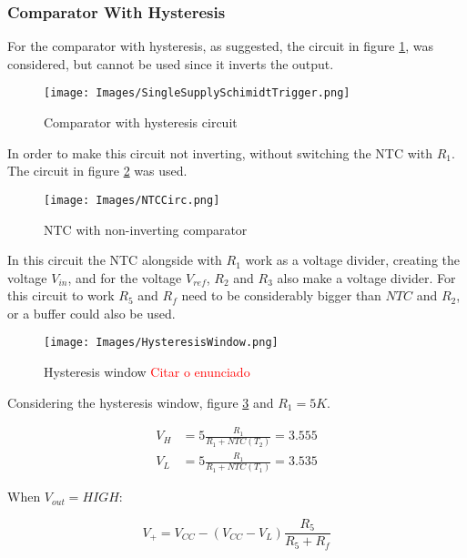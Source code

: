 \subsubsection{Comparator With Hysteresis}

For the comparator with hysteresis, as suggested, the circuit in figure \ref{fig:ComparatorCirc}, was considered, but cannot be used since it inverts the output.

\begin{figure}[H]
    \centering
    \texttt{[image: Images/SingleSupplySchimidtTrigger.png]}
    \caption{Comparator with hysteresis circuit \textsuperscript{\cite{NTC_datasheet}}}
    \label{fig:ComparatorCirc}
\end{figure}

In order to make this circuit not inverting, without switching the NTC with $R_{1}$. The circuit in figure \ref{fig:NTCCirc} was used.

\begin{figure}[H]
    \centering
    \texttt{[image: Images/NTCCirc.png]}
    \caption{NTC with non-inverting comparator}
    \label{fig:NTCCirc}
\end{figure}

In this circuit the NTC alongside with $R_1$ work as a voltage divider, creating the voltage $V_{in}$, and for the voltage $V_{ref}$, $R_2$ and $R_3$ also make a voltage divider. 
For this circuit to work $R_5$ and $R_f$ need to be considerably bigger than $NTC$ and $R_2$, or a buffer could also be used.

\begin{figure}[H]
    \centering
    \texttt{[image: Images/HysteresisWindow.png]}
    \caption{Hysteresis window \textcolor{red}{Citar o enunciado}}
    \label{fig:HysterWindow}
\end{figure}

Considering the hysteresis window, figure \ref{fig:HysterWindow} and $R_1 = 5K$.

\begin{equation}
    \begin{aligned}
        V_H &= 5\frac{R_1}{R_1 + NTC(T_2)} = 3.555\\
        V_L &= 5\frac{R_1}{R_1 + NTC(T_1)} = 3.535
    \end{aligned}
\end{equation}


When $V_{out} = HIGH$:

\begin{equation}
    V_+ = V_{CC}-\left (V_{CC}-V_L\right )\frac{R_5}{R_5 + R_f}
\end{equation}


